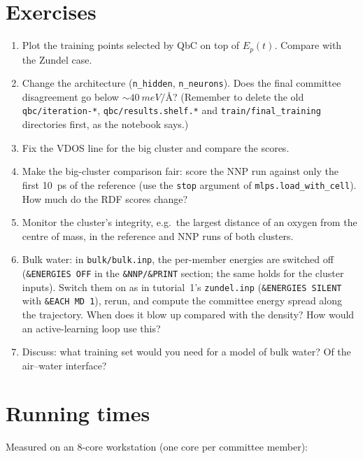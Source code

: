 \documentclass[11pt,a4paper]{article}
\begin{document}
\section{Exercises}
\begin{enumerate}
  \item Plot the training points selected by QbC on top of $E_p(t)$. Compare
        with the Zundel case.
  \item Change the architecture (\texttt{n\_hidden}, \texttt{n\_neurons}). Does
        the final committee disagreement go below
        $\sim\SI{40}{meV/\angstrom}$? (Remember to delete the old
        \texttt{qbc/iteration-*}, \texttt{qbc/results.shelf.*} and
        \texttt{train/final\_training} directories first, as the notebook says.)
  \item Fix the VDOS line for the big cluster and compare the scores.
  \item Make the big-cluster comparison fair: score the NNP run against only
        the first \SI{10}{ps} of the reference (use the \texttt{stop} argument of
        \texttt{mlps.load\_with\_cell}). How much do the RDF scores change?
  \item Monitor the cluster's integrity, e.g.\ the largest distance of an
        oxygen from the centre of mass, in the reference and NNP runs of both
        clusters.
  \item Bulk water: in \texttt{bulk/bulk.inp}, the per-member energies are
        switched off (\texttt{\&ENERGIES OFF} in the \texttt{\&NNP/\&PRINT}
        section; the same holds for the cluster inputs). Switch them on as in
        tutorial~1's \texttt{zundel.inp} (\texttt{\&ENERGIES SILENT} with
        \texttt{\&EACH MD 1}), rerun, and compute
        the committee energy spread along the trajectory. When does it blow
        up compared with the density? How would an active-learning loop use
        this?
  \item Discuss: what training set would you need for a model of bulk water?
        Of the air--water interface?
\end{enumerate}

\section{Running times}
Measured on an 8-core workstation (one core per committee member):
\end{document}
